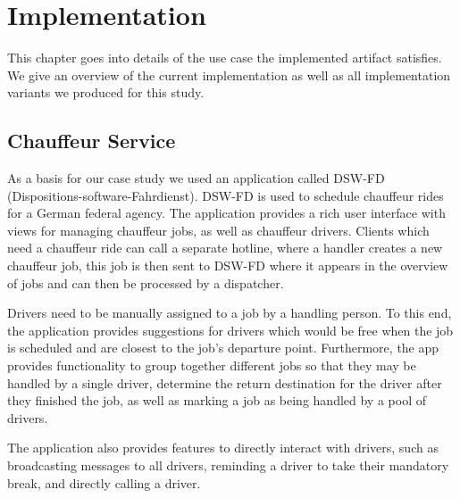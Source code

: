 \chapter{Implementation}
\label{ch:implementation}

This chapter goes into details of the use case the implemented artifact satisfies. We give an overview of the current implementation as well as all implementation variants we produced for this study. 

\section{Chauffeur Service}

As a basis for our case study we used an application called DSW-FD (Dispositions-software-Fahrdienst). DSW-FD is used to schedule chauffeur rides for a German federal agency. The application provides a rich user interface with views for managing chauffeur jobs, as well as chauffeur drivers. Clients which need a chauffeur ride can call a separate hotline, where a handler creates a new chauffeur job, this job is then sent to DSW-FD where it appears in the overview of jobs and can then be processed by a dispatcher.

Drivers need to be manually assigned to a job by a handling person. To this end, the application provides suggestions for drivers which would be free when the job is scheduled and are closest to the job's departure point. Furthermore, the app provides functionality to group together different jobs so that they may be handled by a single driver, determine the return destination for the driver after they finished the job, as well as marking a job as being handled by a pool of drivers.

The application also provides features to directly interact with drivers, such as broadcasting messages to all drivers, reminding a driver to take their mandatory break, and directly calling a driver.

